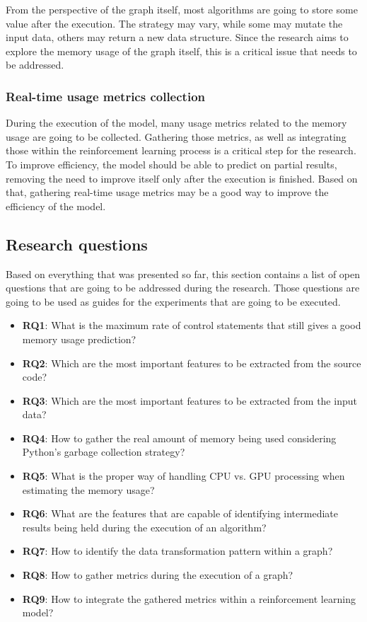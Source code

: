 From the perspective of the graph itself, most algorithms are going to store some value after the execution.
The strategy may vary, while some may mutate the input data, others may return a new data structure.
Since the research aims to explore the memory usage of the graph itself, this is a critical issue that needs to be addressed.

\subsubsection{Real-time usage metrics collection}

During the execution of the model, many usage metrics related to the memory usage are going to be collected.
Gathering those metrics, as well as integrating those within the reinforcement learning process is a critical step for the research.
To improve efficiency, the model should be able to predict on partial results, removing the need to improve itself only after the execution is finished.
Based on that, gathering real-time usage metrics may be a good way to improve the efficiency of the model.

\subsection{Research questions}
\label{subsec:research-questions}

Based on everything that was presented so far, this section contains a list of open questions that are going to be addressed during the research.
Those questions are going to be used as guides for the experiments that are going to be executed.

\begin{itemize}
  \item \textbf{RQ1}: What is the maximum rate of control statements that still gives a good memory usage prediction?
  \item \textbf{RQ2}: Which are the most important features to be extracted from the source code?
  \item \textbf{RQ3}: Which are the most important features to be extracted from the input data?
  \item \textbf{RQ4}: How to gather the real amount of memory being used considering Python's garbage collection strategy?
  \item \textbf{RQ5}: What is the proper way of handling CPU vs. GPU processing when estimating the memory usage?
  \item \textbf{RQ6}: What are the features that are capable of identifying intermediate results being held during the execution of an algorithm?
  \item \textbf{RQ7}: How to identify the data transformation pattern within a graph?
  \item \textbf{RQ8}: How to gather metrics during the execution of a graph?
  \item \textbf{RQ9}: How to integrate the gathered metrics within a reinforcement learning model?
\end{itemize}

